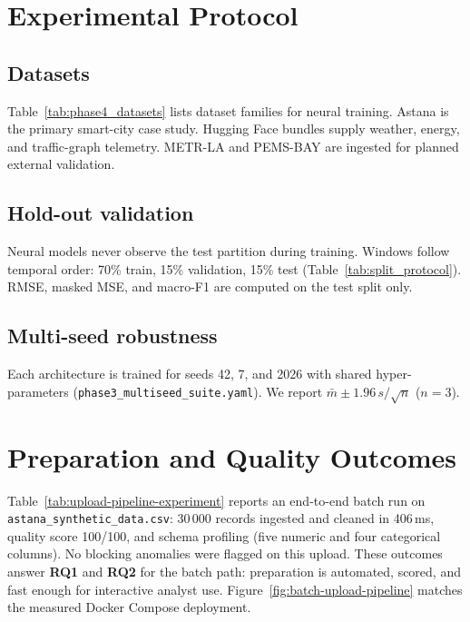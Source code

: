 \section{Experimental Protocol}
\label{sec:exp_protocol}

\subsection{Datasets}

Table~\ref{tab:phase4_datasets} lists dataset families for neural training. Astana is the primary smart-city case study. Hugging Face bundles supply weather, energy, and traffic-graph telemetry. METR-LA and PEMS-BAY are ingested for planned external validation.



\subsection{Hold-out validation}

Neural models never observe the test partition during training. Windows follow temporal order: 70\% train, 15\% validation, 15\% test (Table~\ref{tab:split_protocol}). RMSE, masked MSE, and macro-F1 are computed on the test split only.

\subsection{Multi-seed robustness}

Each architecture is trained for seeds 42, 7, and 2026 with shared hyper-parameters (\texttt{phase3\_multiseed\_suite.yaml}). We report $\bar{m} \pm 1.96\, s/\sqrt{n}$ ($n=3$).

\section{Preparation and Quality Outcomes}
\label{sec:preparation_results}

Table~\ref{tab:upload-pipeline-experiment} reports an end-to-end batch run on \texttt{astana\_synthetic\_data.csv}: 30\,000 records ingested and cleaned in 406\,ms, quality score 100/100, and schema profiling (five numeric and four categorical columns). No blocking anomalies were flagged on this upload. These outcomes answer \textbf{RQ1} and \textbf{RQ2} for the batch path: preparation is automated, scored, and fast enough for interactive analyst use. Figure~\ref{fig:batch-upload-pipeline} matches the measured Docker Compose deployment.

